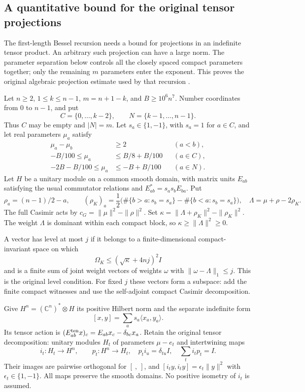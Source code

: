 \subsection{A quantitative bound for the original tensor projections}
\label{archimedean-tensor-projections}

The first-length Bessel recursion needs a bound for projections in an
indefinite tensor product.  An arbitrary such projection can have a
large norm.  The parameter separation below controls all the closely
spaced compact parameters together; only the remaining $m$ parameters
enter the exponent.  This proves the original algebraic projection
estimate used by that recursion \cite{tensor-projection-source}.

Let $n\ge2$, $1\le k\le n-1$, $m=n+1-k$, and $B\ge10^6n^7$.
Number coordinates from $0$ to $n-1$, and put
\[
 C=\{0,\ldots,k-2\},\qquad N=\{k-1,\ldots,n-1\}.
\]
Thus $C$ may be empty and $|N|=m$.  Let $s_a\in\{1,-1\}$, with
$s_a=1$ for $a\in C$, and let real parameters $\mu_a$ satisfy
\begin{equation}\label{tensor-projection-shape}
 \begin{aligned}
 \mu_a-\mu_b&\ge2 &&(a<b),\\
 -B/100\le\mu_a&\le B/8+B/100 &&(a\in C),\\
 -2B-B/100\le\mu_a&\le-B+B/100 &&(a\in N).
 \end{aligned}
\end{equation}
Let $H$ be a unitary module on a common smooth domain, with matrix
units $E_{ab}$ satisfying the usual commutator relations and
$E_{ab}^*=s_as_bE_{ba}$.  Put
\[
 \rho_a=(n-1)/2-a,\qquad
 (\rho_K)_a=\frac12\bigl(\#\{b>a:s_b=s_a\}
                         -\#\{b<a:s_b=s_a\}\bigr),
 \quad \Lambda=\mu+\rho-2\rho_K.
\]
The full Casimir acts by
$c_G=\|\mu\|^2-\|\rho\|^2$.  Set
$\kappa=\|\Lambda+\rho_K\|^2-\|\rho_K\|^2$.
The weight $\Lambda$ is dominant within each compact block, so
$\kappa\ge\|\Lambda\|^2\ge0$.

A vector has level at most $j$ if it belongs to a finite-dimensional
compact-invariant space on which
\[
              \Omega_K\le(\sqrt\kappa+4nj)^2 I
\]
and is a finite sum of joint weight vectors of weights $\omega$ with
$\|\omega-\Lambda\|_1\le j$.  This is the original level condition.
For fixed $j$ these vectors form a subspace: add the finite compact
witnesses and use the self-adjoint compact Casimir decomposition.

Give $H^n=(\mathbb C^n)^*\otimes H$ its positive Hilbert norm and
the separate indefinite form
\[
             [x,y]=\sum_a s_a\langle x_a,y_a\rangle.
\]
Its tensor action is
$(E^{\rm ten}_{ab}x)_c=E_{ab}x_c-\delta_{bc}x_a$.
Retain the original tensor decomposition: unitary modules $H_t$ of
parameters $\mu-e_t$ and intertwining maps
\[
 i_t:H_t\longrightarrow H^n,\qquad p_t:H^n\longrightarrow H_t,
 \quad p_ti_u=\delta_{tu}I,
 \quad\sum_ti_tp_t=I.
\]
Their images are pairwise orthogonal for $[\ ,\ ]$, and
$[i_ty,i_ty]=\epsilon_t\|y\|^2$ with $\epsilon_t\in\{1,-1\}$.
All maps preserve the smooth domains.  No positive isometry of $i_t$
is assumed.

